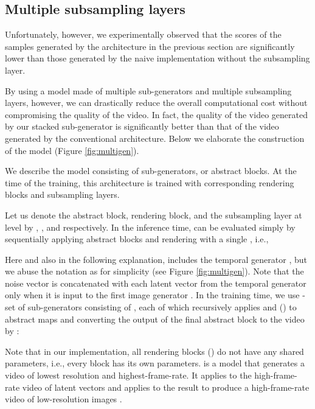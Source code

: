 \documentclass[twocolumn]{svjour3}
\def\Fig#1{Figure \ref{fig:#1}}
\begin{document}
\subsection{Multiple subsampling layers}
\label{sec:multi_abstract_layers}




Unfortunately, however, we experimentally observed that the scores of the samples generated by the architecture in the previous section are significantly lower than those generated by the naive implementation without the subsampling layer.

By using a model made of multiple sub-generators and multiple subsampling layers, however, we can drastically reduce the overall computational cost without compromising the quality of the video.
In fact, the quality of the video generated by our stacked sub-generator is significantly better than that of the video generated by the conventional architecture.
Below we elaborate the construction of the model (\Fig{multigen}).





We describe the model consisting of  sub-generators, or  abstract blocks.
At the time of the training, this architecture is trained with  corresponding rendering blocks and  subsampling layers.


Let us denote the abstract block, rendering block, and the subsampling layer at level  by , , and  respectively.
In the inference time,  can be evaluated simply by sequentially applying abstract blocks and rendering with a single , i.e.,

Here and also in the following explanation,  includes the temporal generator , but we abuse the notation  as  for simplicity (see \Fig{multigen}).
Note that the noise vector is concatenated with each latent vector from the temporal generator only when it is input to the first image generator .
In the training time, we use -set of sub-generators consisting of , each of which recursively applies  and  () to abstract maps and converting the output of the final abstract block  to the video by :

Note that in our implementation, all rendering blocks () do not have any shared parameters, i.e., every block has its own parameters.
 is a model that generates a video of lowest resolution and highest-frame-rate.
It applies  to the high-frame-rate video of latent vectors and applies  to the result to produce a high-frame-rate video of low-resolution images .
\end{document}

